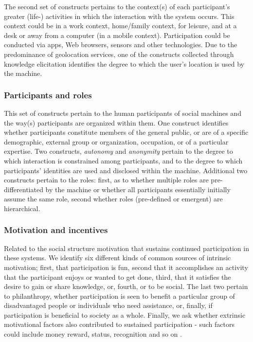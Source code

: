 \documentclass{sig-alternate}
\begin{document}
The second set of constructs pertains to the context(s) of each participant's greater (life-) activities in which the interaction with the system occurs.  This context could be in a work context, home/family context, for leisure, and at a desk or away from a computer (in a mobile context).  Participation could be conducted via apps, Web browsers, sensors and other technologies.  Due to the predominance of geolocation services, one of the constructs collected through knowledge elicitation identifies the degree to which the user's location is used by the machine.

\subsubsection{Participants and roles}
This set of constructs pertain to the human participants of social machines and the way(s) participants are organized within them. One construct identifies whether participants constitute members of the general public, or are of a specific demographic, external group or organization, occupation, or of a particular expertise.  Two constructs, \emph{autonomy} and \emph{anonymity} pertain to the degree to which interaction is constrained among participants, and to the degree to which participants' identities are used and disclosed within the machine. Additional two constructs pertain to the roles: first, as to whether multiple roles are pre-differentiated by the machine or
whether all participants essentially initially assume the same role, second whether roles (pre-defined or emergent) are hierarchical.

\subsubsection{Motivation and incentives}
Related to the social structure  motivation that sustains
continued participation in these systems.  We identify six different
kinds of common sources of intrinsic motivation; first, that
participation is fun, second that it accomplishes an activity that the
participant enjoys or wanted to get done, third, that it satisfies the
desire to gain or share knowledge, or, fourth, or to be social.  The
last two pertain to philanthropy, whether participation is seen to
benefit a particular group of disadvantaged people or individuals who
need assistance, or, finally, if participation is beneficial to
society as a whole.  Finally, we ask whether extrinsic motivational
factors also contributed to sustained participation - such factors
could include money reward, status, recognition and so on \cite{kuznetsov2006motivations,lakhani2003hackers,tagging}.
\end{document}

